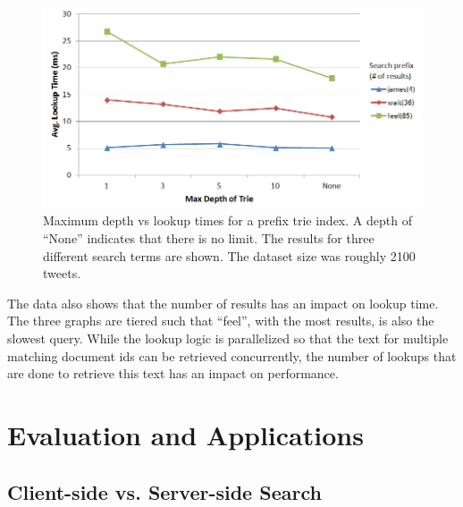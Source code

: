 \documentclass{vldb}
\begin{document}
\begin{figure}[h!]
   \includegraphics[scale=.43]{trie_maxdepth_graph}
  \caption{Maximum depth vs lookup times for a prefix trie index. A depth of ``None'' indicates that there is no limit. The results for three different search terms are shown. The dataset size was roughly 2100 tweets.}
\label{comptrie}
\end{figure}

The data also shows that the number of results has an  impact on lookup time. The three graphs are tiered such that ``feel'', with the most results, is also the slowest query. While the lookup logic is parallelized so that the text for multiple matching document ids can be retrieved concurrently, the number of lookups that are done to retrieve this text has an impact on performance.




\section{Evaluation and Applications}

\subsection{Client-side vs. Server-side Search}
\end{document}
